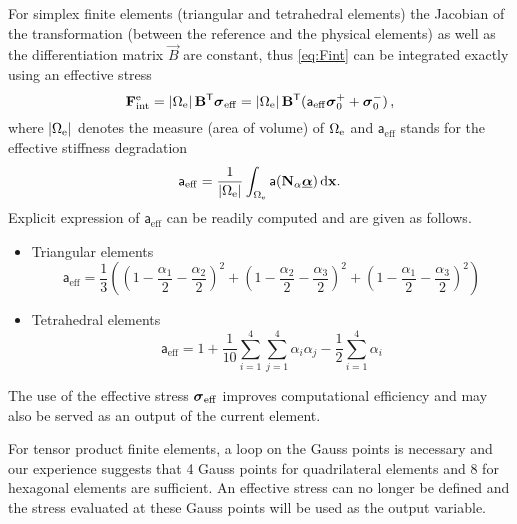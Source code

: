 For simplex finite elements (triangular and tetrahedral elements) the Jacobian of the transformation (between the reference and the physical elements) as well as the differentiation matrix $\vec{B}$ are constant, thus \eqref{eq:Fint} can be integrated exactly using an effective stress
\begin{equation} \label{eq:FintSim}
\vec{F}_\mathrm{int}^\me=\abs{\Omega_\me}\vec{B}^\mT\sig_\mathrm{eff}=\abs{\Omega_\me}\vec{B}^\mT(\mathsf{a}_\mathrm{eff}\sig_0^++\sig_0^-)\,,
\end{equation}
where $\left\lvert{\Omega_{\mathrm{e}}}\right\rvert$ denotes the measure (area of volume) of $\Omega_{\mathrm{e}}$ and $\mathsf{a}_\mathrm{eff}$ stands for the effective stiffness degradation
\[
\mathsf{a}_\mathrm{eff}=\frac{1}{\abs{\Omega_\me}}\int_{\Omega_\me}\mathsf{a}(\vec{N}_\alpha\dvec)\dx.
\]
Explicit expression of $\mathsf{a}_\mathrm{eff}$ can be readily computed and are given as follows.
\begin{itemize}
\item Triangular elements
\[
\mathsf{a}_\mathrm{eff}=\frac{1}{3}\left(\left(1-\frac{\alpha_1}{2}-\frac{\alpha_2}{2}\right)^2+\left(1-\frac{\alpha_2}{2}-\frac{\alpha_3}{2}\right)^2+\left(1-\frac{\alpha_1}{2}-\frac{\alpha_3}{2}\right)^2\right)
\]

\item Tetrahedral elements
\[
\mathsf{a}_\mathrm{eff}=1+\frac{1}{10}\sum_{i=1}^4\sum_{j=1}^4\alpha_i\alpha_j-\frac{1}{2}\sum_{i=1}^4\alpha_i
\]
\end{itemize}
The use of the effective stress $\sig_\mathrm{eff}$ improves computational efficiency and may also be served as an output of the current element.

For tensor product finite elements, a loop on the Gauss points is necessary and our experience suggests that 4 Gauss points for quadrilateral elements and 8 for hexagonal elements are sufficient. An effective stress can no longer be defined and the stress evaluated at these Gauss points will be used as the output variable.

